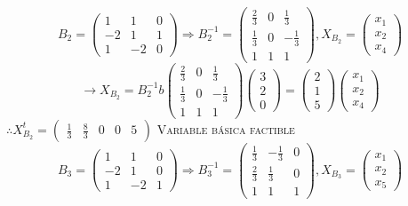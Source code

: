 \begin{itemize}
    $$B_2=\begin{pmatrix}1&1&0\\ -2&1&1\\ 1&-2&0\end{pmatrix}\Rightarrow B_2^{-1}=\begin{pmatrix}\frac{2}{3}&0&\frac{1}{3}\\ \frac{1}{3}&0&-\frac{1}{3}\\ 1&1&1\end{pmatrix}, X_{B_2}=\begin{pmatrix}x_1\\ x_2\\ x_4\end{pmatrix}$$
    $$\rightarrow X_{B_2}=B_2^{-1}b\begin{pmatrix}\frac{2}{3}&0&\frac{1}{3}\\ \frac{1}{3}&0&-\frac{1}{3}\\ 1&1&1\end{pmatrix}\begin{pmatrix}3\\ 2\\ 0\end{pmatrix}=\begin{pmatrix}2\\ 1\\ 5\end{pmatrix}\begin{pmatrix}x_1\\ x_2\\ x_4\end{pmatrix}$$
    $\therefore X_{B_2}^t=\begin{pmatrix}\frac{1}{3}&\frac{8}{3}&0&0&5\end{pmatrix}$ \textsc{Variable básica factible}
    $$B_3=\begin{pmatrix}1&1&0\\ -2&1&0\\ 1&-2&1\end{pmatrix}\Rightarrow B_3^{-1}=\begin{pmatrix}\frac{1}{3}&-\frac{1}{3}&0\\ \frac{2}{3}&\frac{1}{3}&0\\ 1&1&1\end{pmatrix}, X_{B_3}=\begin{pmatrix}x_1\\ x_2\\ x_5\end{pmatrix}$$

\end{itemize}
